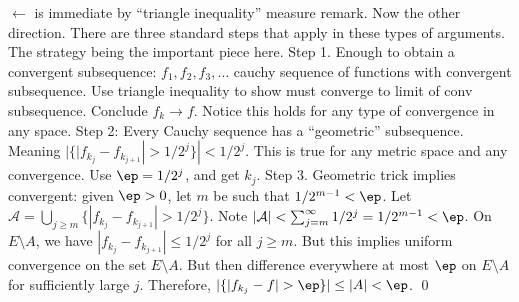 \pfsk $\leftarrow$ is immediate by ``triangle inequality'' measure remark. Now the other direction. There are three standard steps that apply in these types of arguments. The strategy being the important piece here. Step 1. Enough to obtain a convergent subsequence: $f_1,f_2,f_3,\ldots$ cauchy sequence of functions with convergent subsequence. Use triangle inequality to show must converge to limit of conv subsequence. Conclude $f_k \to f$. Notice this holds for any type of convergence in any space. Step 2: Every Cauchy sequence has a ``geometric'' subsequence. Meaning $|\{ |f_{k_j} - f_{k_{j+1}}|>1/2^j\}|<1/2^j$. This is true for any metric space and any convergence. Use $\ep=1/2^j$, and get $k_j$. Step 3. Geometric trick implies convergent: given $\ep>0$, let $m$ be such that $1/2^{m-1}<\ep$. Let $\mathcal{A}= \bigcup_{j \geq m} \{ |f_{k_j} - f_{k_{j+1}}|>1/2^j\}$. Note $|\mathcal{A}|< \sum_{j=m}^\infty 1/2^j = 1/2^{m-1}<\ep$. On $E \setminus A$, we have $|f_{k_j} - f_{k_{j+1}}| \leq 1/2^j$ for all $j \geq m$. But this implies uniform convergence on the set $E \setminus A$. But then difference everywhere at most $\ep$ on $E \setminus A$ for sufficiently large $j$. Therefore, $|\{ |f_{k_j} - f|>\ep\}| \leq |A|<\ep$. \qed \\ 




























